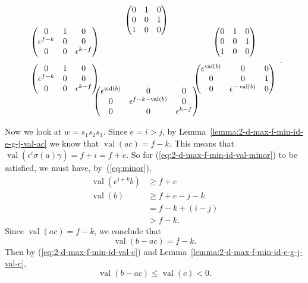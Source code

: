 \documentclass{amsart}
\theoremstyle{definition}
\def\e{\epsilon}
\def\val{\mathop{\mathrm{val}}}
\def\s{\sigma}
\def\heximages#1#2#3#4#5#6{
  \heximagessqueezedcarefully{1.7em}{-1em}{#1}{#2}{#3}{#4}{#5}{#6}
}
\def\heximagessqueezedcarefully#1#2#3#4#5#6#7#8{
  \begin{array}{ccc}
    & #3 & \\[#2]
    #5 \hspace{-#1} & & \hspace{-#1} #4 \\[2em]
    #6 \hspace{-#1} & & \hspace{-#1} #7 \\[#2]
    & #8 &
  \end{array}
}
\begin{document}
  \begin{equation}
    \label{eq:2-d-max-f-min-s1-hex2}
    \heximages
	{\begin{pmatrix}
            0 & 1 & 0 \\
            0 & 0 & 1 \\
            1 & 0 & 0
	\end{pmatrix}}
	{\begin{pmatrix}
            0 & 1 & 0 \\
            0 & 0 & 1 \\
            1 & 0 & 0
	\end{pmatrix}}
	{\begin{pmatrix}
            0 & 1 & 0 \\
            \e^{f-k} & 0 & 0  \\
            0 & 0 & \e^{k-f}
	\end{pmatrix}}
	{\begin{pmatrix}
            0 & 1 & 0 \\
            \e^{f-k} & 0 & 0  \\
            0 & 0 & \e^{k-f}
	\end{pmatrix}}
	{\begin{pmatrix}
            \e^{\val(b)} & 0 & 0 \\
            0 & 0 & 1 \\
            0 & \e^{-\val(b)} & 0
	\end{pmatrix}}
	{\begin{pmatrix}
            \e^{\val(b)} & 0 & 0 \\
            0 & \e^{f-k-\val(b)} & 0  \\
            0 & 0 & \e^{k-f}
	\end{pmatrix}}.
  \end{equation}

  Now we look at $w = s_1s_2s_1$.  Since $e = i > j$, by
  Lemma~\ref{lemma:2-d-max-f-min-id-e-g-j-val-ac} we know that $\val(ac) = f -
  k$.  This means that $\val(\e^i\s(a)\gamma) = f + i = f + e$.  So for
  (\ref{eq:2-d-max-f-min-id-val-minor}) to be satisfied, we must have,
  by~(\ref{eq:minor}),
  \begin{align*}
    \val(\e^{j+k}b) &\ge f + e \\
    \val(b) &\ge f + e - j - k \\
            &= f  - k + (i - j) \\
            &> f-k.
  \end{align*}
  Since $\val(ac) = f -k$, we conclude that
  \begin{equation}
    \label{eq:2-d-max-f-min-id-e-eq-i-val-b-minus-ac}
    \val(b-ac) = f - k.
  \end{equation}
  Then by (\ref{eq:2-d-max-f-min-id-val-c}) and
  Lemma~\ref{lemma:2-d-max-f-min-id-e-g-j-val-c},
  \begin{equation}
    \label{eq:2-d-max-f-min-id-e-eq-i-val-b-minus-ac2}
    \val(b-ac) \le \val(c) < 0.
  \end{equation}
\end{document}
